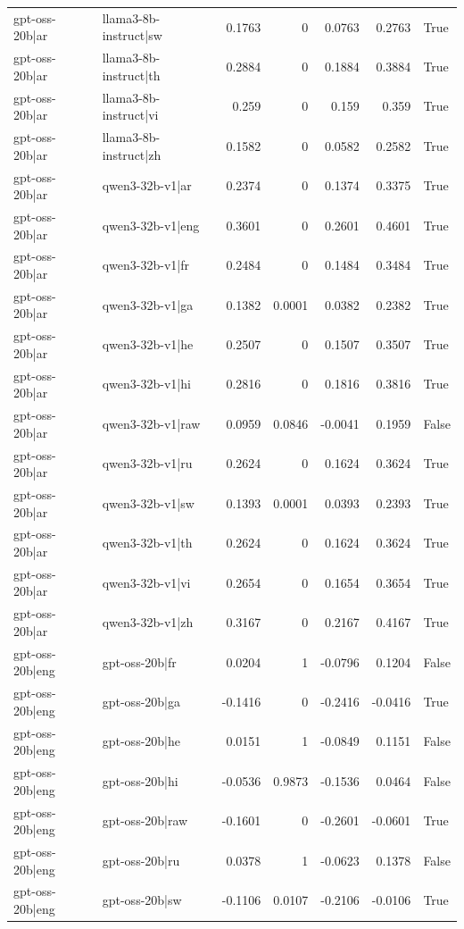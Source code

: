 \begin{table}
\begin{tabular}{l l r r r r l}
gpt-oss-20b|ar & llama3-8b-instruct|sw & 0.1763 & 0 & 0.0763 & 0.2763 & True \\
gpt-oss-20b|ar & llama3-8b-instruct|th & 0.2884 & 0 & 0.1884 & 0.3884 & True \\
gpt-oss-20b|ar & llama3-8b-instruct|vi & 0.259 & 0 & 0.159 & 0.359 & True \\
gpt-oss-20b|ar & llama3-8b-instruct|zh & 0.1582 & 0 & 0.0582 & 0.2582 & True \\
gpt-oss-20b|ar & qwen3-32b-v1|ar & 0.2374 & 0 & 0.1374 & 0.3375 & True \\
gpt-oss-20b|ar & qwen3-32b-v1|eng & 0.3601 & 0 & 0.2601 & 0.4601 & True \\
gpt-oss-20b|ar & qwen3-32b-v1|fr & 0.2484 & 0 & 0.1484 & 0.3484 & True \\
gpt-oss-20b|ar & qwen3-32b-v1|ga & 0.1382 & 0.0001 & 0.0382 & 0.2382 & True \\
gpt-oss-20b|ar & qwen3-32b-v1|he & 0.2507 & 0 & 0.1507 & 0.3507 & True \\
gpt-oss-20b|ar & qwen3-32b-v1|hi & 0.2816 & 0 & 0.1816 & 0.3816 & True \\
gpt-oss-20b|ar & qwen3-32b-v1|raw & 0.0959 & 0.0846 & -0.0041 & 0.1959 & False \\
gpt-oss-20b|ar & qwen3-32b-v1|ru & 0.2624 & 0 & 0.1624 & 0.3624 & True \\
gpt-oss-20b|ar & qwen3-32b-v1|sw & 0.1393 & 0.0001 & 0.0393 & 0.2393 & True \\
gpt-oss-20b|ar & qwen3-32b-v1|th & 0.2624 & 0 & 0.1624 & 0.3624 & True \\
gpt-oss-20b|ar & qwen3-32b-v1|vi & 0.2654 & 0 & 0.1654 & 0.3654 & True \\
gpt-oss-20b|ar & qwen3-32b-v1|zh & 0.3167 & 0 & 0.2167 & 0.4167 & True \\
gpt-oss-20b|eng & gpt-oss-20b|fr & 0.0204 & 1 & -0.0796 & 0.1204 & False \\
gpt-oss-20b|eng & gpt-oss-20b|ga & -0.1416 & 0 & -0.2416 & -0.0416 & True \\
gpt-oss-20b|eng & gpt-oss-20b|he & 0.0151 & 1 & -0.0849 & 0.1151 & False \\
gpt-oss-20b|eng & gpt-oss-20b|hi & -0.0536 & 0.9873 & -0.1536 & 0.0464 & False \\
gpt-oss-20b|eng & gpt-oss-20b|raw & -0.1601 & 0 & -0.2601 & -0.0601 & True \\
gpt-oss-20b|eng & gpt-oss-20b|ru & 0.0378 & 1 & -0.0623 & 0.1378 & False \\
gpt-oss-20b|eng & gpt-oss-20b|sw & -0.1106 & 0.0107 & -0.2106 & -0.0106 & True \\

\end{tabular}
\end{table}
